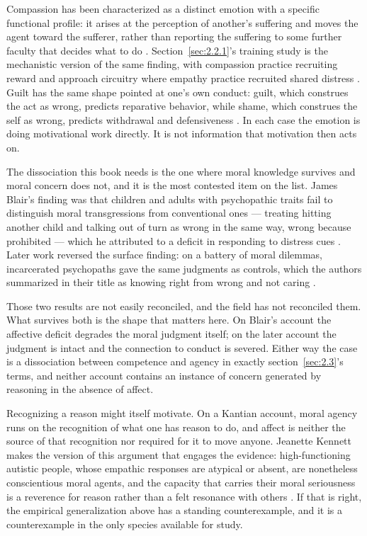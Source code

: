 Compassion has been characterized as a distinct emotion with a specific functional profile: it arises at the perception of another's suffering and moves the agent toward the sufferer, rather than reporting the suffering to some further faculty that decides what to do \autocite{goetz2010compassion}. Section~\ref{sec:2.2.1}'s training study is the mechanistic version of the same finding, with compassion practice recruiting reward and approach circuitry where empathy practice recruited shared distress \autocite{klimecki2013differential}. Guilt has the same shape pointed at one's own conduct: guilt, which construes the act as wrong, predicts reparative behavior, while shame, which construes the self as wrong, predicts withdrawal and defensiveness \autocite{tangney2007moral}. In each case the emotion is doing motivational work directly. It is not information that motivation then acts on.

The dissociation this book needs is the one where moral knowledge survives and moral concern does not, and it is the most contested item on the list. James Blair's finding was that children and adults with psychopathic traits fail to distinguish moral transgressions from conventional ones — treating hitting another child and talking out of turn as wrong in the same way, wrong because prohibited — which he attributed to a deficit in responding to distress cues \autocite{blair1995cognitive}. Later work reversed the surface finding: on a battery of moral dilemmas, incarcerated psychopaths gave the same judgments as controls, which the authors summarized in their title as knowing right from wrong and not caring \autocite{cima2010psychopaths}.

Those two results are not easily reconciled, and the field has not reconciled them. What survives both is the shape that matters here. On Blair's account the affective deficit degrades the moral judgment itself; on the later account the judgment is intact and the connection to conduct is severed. Either way the case is a dissociation between competence and agency in exactly section~\ref{sec:2.3}'s terms, and neither account contains an instance of concern generated by reasoning in the absence of affect.

Recognizing a reason might itself motivate. On a Kantian account, moral agency runs on the recognition of what one has reason to do, and affect is neither the source of that recognition nor required for it to move anyone. Jeanette Kennett makes the version of this argument that engages the evidence: high-functioning autistic people, whose empathic responses are atypical or absent, are nonetheless conscientious moral agents, and the capacity that carries their moral seriousness is a reverence for reason rather than a felt resonance with others \autocite{kennett2002autism}. If that is right, the empirical generalization above has a standing counterexample, and it is a counterexample in the only species available for study.

